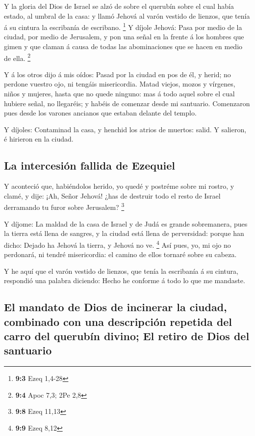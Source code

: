  Y la gloria del Dios de Israel se alzó de sobre el
querubín sobre el cual había estado, al umbral de la casa: y llamó
Jehová al varón vestido de lienzos, que tenía á su cintura la escribanía
de escribano. \footnote{\textbf{9:3} Ezeq 1,4-28}  Y
díjole Jehová: Pasa por medio de la ciudad, por medio de Jerusalem, y
pon una señal en la frente á los hombres que gimen y que claman á causa
de todas las abominaciones que se hacen en medio de ella. \footnote{\textbf{9:4}
  Apoc 7,3; 2Pe 2,8}

 Y á los otros dijo á mis oídos: Pasad por la ciudad en
pos de él, y herid; no perdone vuestro ojo, ni tengáis misericordia.
 Matad viejos, mozos y vírgenes, niños y mujeres, hasta
que no quede ninguno: mas á todo aquel sobre el cual hubiere señal, no
llegaréis; y habéis de comenzar desde mi santuario. Comenzaron pues
desde los varones ancianos que estaban delante del templo.

 Y díjoles: Contaminad la casa, y henchid los atrios de
muertos: salid. Y salieron, é hirieron en la ciudad.

\hypertarget{la-intercesiuxf3n-fallida-de-ezequiel}{%
\subsection{La intercesión fallida de
Ezequiel}\label{la-intercesiuxf3n-fallida-de-ezequiel}}

 Y aconteció que, habiéndolos herido, yo quedé y postréme
sobre mi rostro, y clamé, y dije: ¡Ah, Señor Jehová! ¿has de destruir
todo el resto de Israel derramando tu furor sobre Jerusalem? \footnote{\textbf{9:8}
  Ezeq 11,13}

 Y díjome: La maldad de la casa de Israel y de Judá es
grande sobremanera, pues la tierra está llena de sangres, y la ciudad
está llena de perversidad: porque han dicho: Dejado ha Jehová la tierra,
y Jehová no ve. \footnote{\textbf{9:9} Ezeq 8,12}  Así
pues, yo, mi ojo no perdonará, ni tendré misericordia: el camino de
ellos tornaré sobre su cabeza.

 Y he aquí que el varón vestido de lienzos, que tenía la
escribanía á su cintura, respondió una palabra diciendo: Hecho he
conforme á todo lo que me mandaste.

\hypertarget{el-mandato-de-dios-de-incinerar-la-ciudad-combinado-con-una-descripciuxf3n-repetida-del-carro-del-querubuxedn-divino-el-retiro-de-dios-del-santuario}{%
\subsection{El mandato de Dios de incinerar la ciudad, combinado con una
descripción repetida del carro del querubín divino; El retiro de Dios
del
santuario}\label{el-mandato-de-dios-de-incinerar-la-ciudad-combinado-con-una-descripciuxf3n-repetida-del-carro-del-querubuxedn-divino-el-retiro-de-dios-del-santuario}}

